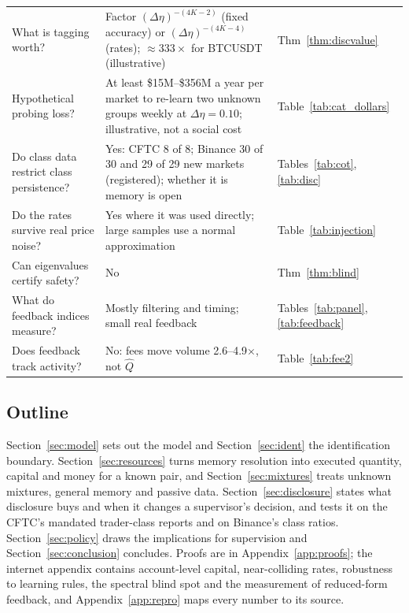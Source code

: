 \documentclass[12pt]{article}
\theoremstyle{definition}
\theoremstyle{remark}
\begin{document}
\begin{table}[t]
\begin{threeparttable}
\begin{tabular}{p{}p{}p{}}
What is tagging worth? & Factor $(\Delta\eta)^{-(4K-2)}$ (fixed accuracy) or $(\Delta\eta)^{-(4K-4)}$ (rates); $\approx333\times$ for BTCUSDT (illustrative) & Thm~\ref{thm:discvalue}\\
Hypothetical probing loss? & At least \$15M--\$356M a year per market to re-learn two unknown groups weekly at $\Delta\eta=0.10$; illustrative, not a social cost & Table~\ref{tab:cat_dollars}\\
Do class data restrict class persistence? & Yes: CFTC 8 of 8; Binance 30 of 30 and 29 of 29 new markets (registered); whether it is memory is open & Tables~\ref{tab:cot}, \ref{tab:disc}\\
Do the rates survive real price noise? & Yes where it was used directly; large samples use a normal approximation & Table~\ref{tab:injection}\\
Can eigenvalues certify safety? & No & Thm~\ref{thm:blind}\\
What do feedback indices measure? & Mostly filtering and timing; small real feedback & Tables~\ref{tab:panel}, \ref{tab:feedback}\\
Does feedback track activity? & No: fees move volume 2.6--4.9$\times$, not $\hat Q$ & Table~\ref{tab:fee2}\\
\bottomrule
\end{tabular}
\end{threeparttable}
\end{table}

\subsection{Outline}
Section~\ref{sec:model} sets out the model and Section~\ref{sec:ident} the identification boundary. Section~\ref{sec:resources} turns memory resolution into executed quantity, capital and money for a known pair, and Section~\ref{sec:mixtures} treats unknown mixtures, general memory and passive data. Section~\ref{sec:disclosure} states what disclosure buys and when it changes a supervisor's decision, and tests it on the CFTC's mandated trader-class reports and on Binance's class ratios. Section~\ref{sec:policy} draws the implications for supervision and Section~\ref{sec:conclusion} concludes. Proofs are in Appendix~\ref{app:proofs}; the internet appendix contains account-level capital, near-colliding rates, robustness to learning rules, the spectral blind spot and the measurement of reduced-form feedback, and Appendix~\ref{app:repro} maps every number to its source.
\end{document}
